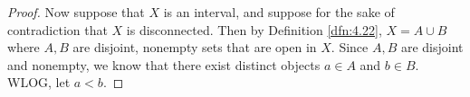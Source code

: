 \documentclass[../main.tex]{subfiles}
\begin{document}
\begin{theorem}
\begin{proof}
        Now suppose that $X$ is an interval, and suppose for the sake of contradiction that $X$ is disconnected. Then by Definition \ref{dfn:4.22}, $X=A\cup B$ where $A,B$ are disjoint, nonempty sets that are open in $X$. Since $A,B$ are disjoint and nonempty, we know that there exist distinct objects $a\in A$ and $b\in B$. WLOG, let $a<b$.\par\smallskip

\end{proof}
\end{theorem}
\end{document}

